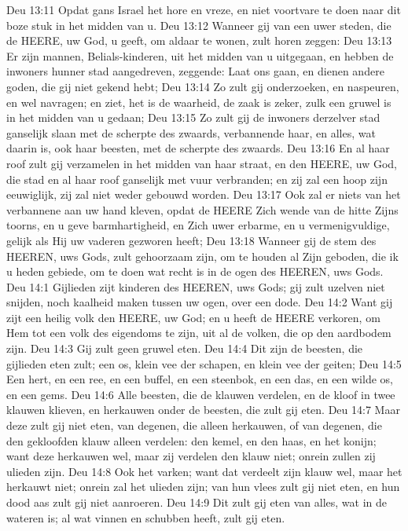 Deu 13:11  Opdat gans Israel het hore en vreze, en niet voortvare te doen naar dit boze stuk in het midden van u.
Deu 13:12  Wanneer gij van een uwer steden, die de HEERE, uw God, u geeft, om aldaar te wonen, zult horen zeggen:
Deu 13:13  Er zijn mannen, Belials-kinderen, uit het midden van u uitgegaan, en hebben de inwoners hunner stad aangedreven, zeggende: Laat ons gaan, en dienen andere goden, die gij niet gekend hebt;
Deu 13:14  Zo zult gij onderzoeken, en naspeuren, en wel navragen; en ziet, het is de waarheid, de zaak is zeker, zulk een gruwel is in het midden van u gedaan;
Deu 13:15  Zo zult gij de inwoners derzelver stad ganselijk slaan met de scherpte des zwaards, verbannende haar, en alles, wat daarin is, ook haar beesten, met de scherpte des zwaards.
Deu 13:16  En al haar roof zult gij verzamelen in het midden van haar straat, en den HEERE, uw God, die stad en al haar roof ganselijk met vuur verbranden; en zij zal een hoop zijn eeuwiglijk, zij zal niet weder gebouwd worden.
Deu 13:17  Ook zal er niets van het verbannene aan uw hand kleven, opdat de HEERE Zich wende van de hitte Zijns toorns, en u geve barmhartigheid, en Zich uwer erbarme, en u vermenigvuldige, gelijk als Hij uw vaderen gezworen heeft;
Deu 13:18  Wanneer gij de stem des HEEREN, uws Gods, zult gehoorzaam zijn, om te houden al Zijn geboden, die ik u heden gebiede, om te doen wat recht is in de ogen des HEEREN, uws Gods.
Deu 14:1  Gijlieden zijt kinderen des HEEREN, uws Gods; gij zult uzelven niet snijden, noch kaalheid maken tussen uw ogen, over een dode.
Deu 14:2  Want gij zijt een heilig volk den HEERE, uw God; en u heeft de HEERE verkoren, om Hem tot een volk des eigendoms te zijn, uit al de volken, die op den aardbodem zijn.
Deu 14:3  Gij zult geen gruwel eten.
Deu 14:4  Dit zijn de beesten, die gijlieden eten zult; een os, klein vee der schapen, en klein vee der geiten;
Deu 14:5  Een hert, en een ree, en een buffel, en een steenbok, en een das, en een wilde os, en een gems.
Deu 14:6  Alle beesten, die de klauwen verdelen, en de kloof in twee klauwen klieven, en herkauwen onder de beesten, die zult gij eten.
Deu 14:7  Maar deze zult gij niet eten, van degenen, die alleen herkauwen, of van degenen, die den gekloofden klauw alleen verdelen: den kemel, en den haas, en het konijn; want deze herkauwen wel, maar zij verdelen den klauw niet; onrein zullen zij ulieden zijn.
Deu 14:8  Ook het varken; want dat verdeelt zijn klauw wel, maar het herkauwt niet; onrein zal het ulieden zijn; van hun vlees zult gij niet eten, en hun dood aas zult gij niet aanroeren.
Deu 14:9  Dit zult gij eten van alles, wat in de wateren is; al wat vinnen en schubben heeft, zult gij eten.
